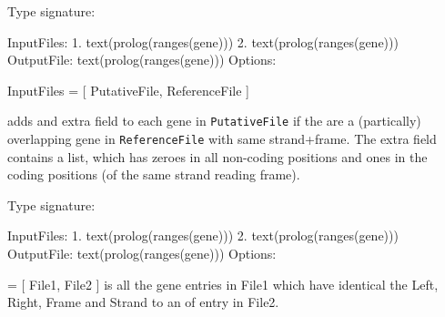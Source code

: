 \vspace{0.7cm}

\begin{description}
Type signature:

\begin{code}
InputFiles:
    1. text(prolog(ranges(gene)))
    2. text(prolog(ranges(gene)))
OutputFile:
    text(prolog(ranges(gene)))
Options:
\end{code}

\begin{code}
InputFiles = [ PutativeFile, ReferenceFile ]
\end{code}

adds and extra field to each gene in \verb$PutativeFile$ if the are a (partically) overlapping gene in \verb$ReferenceFile$ with same strand+frame.
The extra field contains a list, which
has zeroes in all non-coding positions and ones in the coding positions (of the same strand reading frame).

Type signature:

\begin{code}
InputFiles:
    1. text(prolog(ranges(gene)))
    2. text(prolog(ranges(gene)))
OutputFile:
    text(prolog(ranges(gene)))
Options:
\end{code}

 = [ File1, File2 ]
 is all the gene entries in File1 which have identical the Left, Right, Frame and Strand to an of entry in File2.
\end{description}

